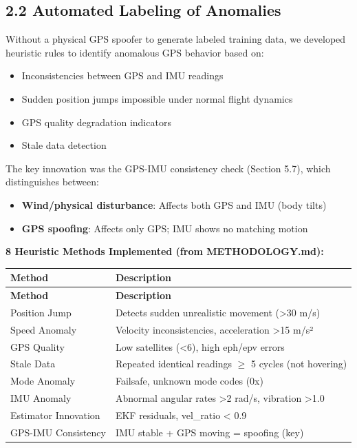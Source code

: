 \documentclass[12pt,a4paper]{article}
\begin{document}
\subsection{2.2 Automated Labeling of Anomalies}

Without a physical GPS spoofer to generate labeled training data, we developed heuristic rules to identify anomalous GPS behavior based on:

\begin{itemize}
    \item Inconsistencies between GPS and IMU readings
    \item Sudden position jumps impossible under normal flight dynamics
    \item GPS quality degradation indicators
    \item Stale data detection
\end{itemize}

The key innovation was the GPS-IMU consistency check (Section 5.7), which distinguishes between:
\begin{itemize}
    \item \textbf{Wind/physical disturbance}: Affects both GPS and IMU (body tilts)
    \item \textbf{GPS spoofing}: Affects only GPS; IMU shows no matching motion
\end{itemize}

\textbf{8 Heuristic Methods Implemented (from METHODOLOGY.md):}
\begin{longtable}{|p{3.5cm}|p{11cm}|}
\hline
\textbf{Method} & \textbf{Description} \\
\hline
\endfirsthead
\hline
\textbf{Method} & \textbf{Description} \\
\hline
\endhead
\hline
Position Jump & Detects sudden unrealistic movement (>30 m/s) \\
\hline
Speed Anomaly & Velocity inconsistencies, acceleration >15 m/s² \\
\hline
GPS Quality & Low satellites (<6), high eph/epv errors \\
\hline
Stale Data & Repeated identical readings $\ge$ 5 cycles (not hovering) \\
\hline
Mode Anomaly & Failsafe, unknown mode codes (0x) \\
\hline
IMU Anomaly & Abnormal angular rates >2 rad/s, vibration >1.0 \\
\hline
Estimator Innovation & EKF residuals, vel\_ratio < 0.9 \\
\hline
GPS-IMU Consistency & IMU stable + GPS moving = spoofing (key) \\
\hline
\end{longtable}
\end{document}
